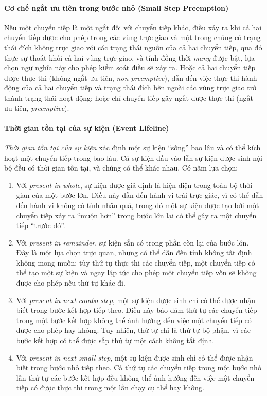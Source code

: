 \paragraph{Cơ chế ngắt ưu tiên trong bước nhỏ (Small Step Preemption)}
Nếu một chuyển tiếp là một ngắt đối với chuyển tiếp khác, điều xảy ra khi cả hai chuyển tiếp được cho phép trong các vùng trực giao và một trong chúng có trạng thái đích không trực giao với các trạng thái nguồn của cả hai chuyển tiếp, qua đó thực sự thoát khỏi cả hai vùng trực giao, và tính đồng thời \emph{many} được bật, lựa chọn ngữ nghĩa này cho phép kiểm soát điều sẽ xảy ra. Hoặc cả hai chuyển tiếp được thực thi (không ngắt ưu tiên, \emph{non-preemptive}), dẫn đến việc thực thi hành động của cả hai chuyển tiếp và trạng thái đích bên ngoài các vùng trực giao trở thành trạng thái hoạt động; hoặc chỉ chuyển tiếp gây ngắt được thực thi (ngắt ưu tiên, \emph{preemptive}).

\paragraph{Thời gian tồn tại của sự kiện (Event Lifeline)}
\emph{Thời gian tồn tại của sự kiện} xác định một sự kiện ``sống'' bao lâu và có thể kích hoạt một chuyển tiếp trong bao lâu. Cả sự kiện đầu vào lẫn sự kiện được sinh nội bộ đều có thời gian tồn tại, và chúng có thể khác nhau. Có năm lựa chọn:
\begin{enumerate}
\item Với \emph{present in whole}, sự kiện được giả định là hiện diện trong toàn bộ thời gian của một bước lớn. Điều này dẫn đến hành vi trái trực giác, vì có thể dẫn đến hành vi không có tính nhân quả, trong đó một sự kiện được tạo bởi một chuyển tiếp xảy ra ``muộn hơn'' trong bước lớn lại có thể gây ra một chuyển tiếp ``trước đó''.
\item Với \emph{present in remainder}, sự kiện sẵn có trong phần còn lại của bước lớn. Đây là một lựa chọn trực quan, nhưng có thể dẫn đến tính không tất định không mong muốn: tùy thứ tự thực thi các chuyển tiếp, một chuyển tiếp có thể tạo một sự kiện và ngay lập tức cho phép một chuyển tiếp vốn sẽ không được cho phép nếu thứ tự khác đi.
\item Với \emph{present in next combo step}, một sự kiện được sinh chỉ có thể được nhận biết trong bước kết hợp tiếp theo. Điều này bảo đảm thứ tự các chuyển tiếp trong một bước kết hợp không thể ảnh hưởng đến việc một chuyển tiếp có được cho phép hay không. Tuy nhiên, thứ tự chỉ là thứ tự bộ phận, vì các bước kết hợp có thể được sắp thứ tự một cách không tất định.
\item Với \emph{present in next small step}, một sự kiện được sinh chỉ có thể được nhận biết trong bước nhỏ tiếp theo. Cả thứ tự các chuyển tiếp trong một bước nhỏ lẫn thứ tự các bước kết hợp đều không thể ảnh hưởng đến việc một chuyển tiếp có được thực thi trong một lần chạy cụ thể hay không.
\end{enumerate}

